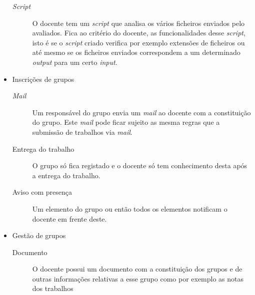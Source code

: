 \begin{itemize}
		\begin{description}
			\item[\emph{Script}] O docente tem um \emph{script} que analisa os vários ficheiros enviados pelo avaliados. Fica ao critério do docente, as funcionalidades desse \emph{script}, isto é se o \emph{script} criado verifica por exemplo extensões de ficheiros ou até mesmo se os ficheiros enviados correspondem a um determinado \emph{output} para um certo \emph{input}.
		\end{description}
	\item Inscrições de grupos
	\begin{description}
		\item[\emph{Mail}] Um responsável do grupo envia um \emph{mail} ao docente com a constituição do grupo. Este \emph{mail} pode ficar sujeito as mesma regras que a submissão de trabalhos via \emph{mail}.
		\item[Entrega do trabalho] O grupo só fica registado e o docente só tem conhecimento desta após a entrega do trabalho.
		\item[Aviso com presença] Um elemento do grupo ou então todos os elementos notificam o docente em frente deste.
	\end{description}
	\item Gestão de grupos
	\begin{description}
		\item[Documento] O docente possui um documento com a constituição dos grupos e de outras informações relativas a esse grupo como por exemplo as notas dos trabalhos
	\end{description}

\end{itemize}






